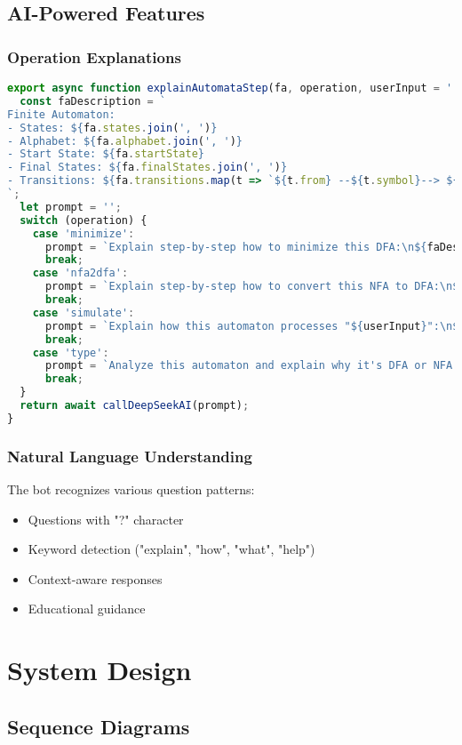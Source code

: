 \documentclass[12pt]{article}
\begin{document}
\subsection{AI-Powered Features}

\subsubsection{Operation Explanations}
\begin{lstlisting}[language=JavaScript]
export async function explainAutomataStep(fa, operation, userInput = '') {
  const faDescription = `
Finite Automaton:
- States: ${fa.states.join(', ')}
- Alphabet: ${fa.alphabet.join(', ')}
- Start State: ${fa.startState}
- Final States: ${fa.finalStates.join(', ')}
- Transitions: ${fa.transitions.map(t => `${t.from} --${t.symbol}--> ${t.to}`).join(', ')}
`;
  let prompt = '';
  switch (operation) {
    case 'minimize':
      prompt = `Explain step-by-step how to minimize this DFA:\n${faDescription}`;
      break;
    case 'nfa2dfa':
      prompt = `Explain step-by-step how to convert this NFA to DFA:\n${faDescription}`;
      break;
    case 'simulate':
      prompt = `Explain how this automaton processes "${userInput}":\n${faDescription}`;
      break;
    case 'type':
      prompt = `Analyze this automaton and explain why it's DFA or NFA:\n${faDescription}`;
      break;
  }
  return await callDeepSeekAI(prompt);
}
\end{lstlisting}

\subsubsection{Natural Language Understanding}
The bot recognizes various question patterns:
\begin{itemize}
    \item Questions with "?" character
    \item Keyword detection ("explain", "how", "what", "help")
    \item Context-aware responses
    \item Educational guidance
\end{itemize}

\section{System Design}

\subsection{Sequence Diagrams}
\end{document}
